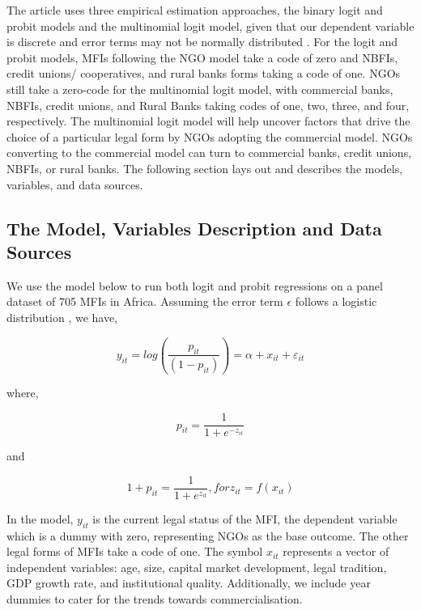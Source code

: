 \documentclass[a4paper,nobind]{templates/ociamthesis}
\begin{document}
The article uses three empirical estimation approaches, the binary logit and probit models and the multinomial logit model, given that our dependent variable is discrete and error terms may not be normally distributed \autocite{cramer2002origins}. For the logit and probit models, MFIs following the NGO model take a code of zero and NBFIs, credit unions/ cooperatives, and rural banks forms taking a code of one. NGOs still take a zero-code for the multinomial logit model, with commercial banks, NBFIs, credit unions, and Rural Banks taking codes of one, two, three, and four, respectively. The multinomial logit model will help uncover factors that drive the choice of a particular legal form by NGOs adopting the commercial model. NGOs converting to the commercial model can turn to commercial banks, credit unions, NBFIs, or rural banks. The following section lays out and describes the models, variables, and data sources.

\hypertarget{the-model-variables-description-and-data-sources}{%
\subsection{The Model, Variables Description and Data Sources}\label{the-model-variables-description-and-data-sources}}

We use the model below to run both logit and probit regressions on a panel dataset of 705 MFIs in Africa. Assuming the error term \(\epsilon\) follows a logistic distribution \autocite{czepiel2002maximum}, we have,

\begin{equation}
y_{it} = log(\frac{p_{it}}{(1-p_{it})} ) = \alpha + x_{it} + \varepsilon_{it}
\end{equation}

where,

\begin{equation}
p_{it}  =  \frac{1}{1 +  e^{- z_{it} } } 
\end{equation}

and

\begin{equation}
1 + p_{it}  =  \frac{1}{1 +  e^{z_{it} } }, for z_{it} = f(x_{it})
\end{equation}

In the model, \(y_{it}\) is the current legal status of the MFI, the dependent variable which is a dummy with zero, representing NGOs as the base outcome. The other legal forms of MFIs take a code of one. The symbol \(x_{it}\) represents a vector of independent variables: age, size, capital market development, legal tradition, GDP growth rate, and institutional quality. Additionally, we include year dummies to cater for the trends towards commercialisation.
\end{document}

